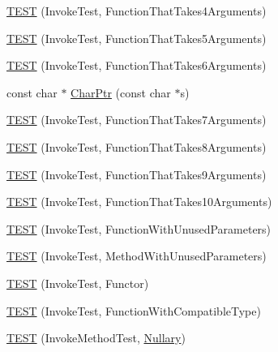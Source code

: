 \begin{DoxyCompactItemize}
\item 
\mbox{\hyperlink{namespacetesting_1_1gmock__more__actions__test_a17f41c1f7f180371d4d240089cdff0dd}{T\+E\+ST}} (Invoke\+Test, Function\+That\+Takes4\+Arguments)
\item 
\mbox{\hyperlink{namespacetesting_1_1gmock__more__actions__test_a3b6b1b682295a1d04d57374445359e94}{T\+E\+ST}} (Invoke\+Test, Function\+That\+Takes5\+Arguments)
\item 
\mbox{\hyperlink{namespacetesting_1_1gmock__more__actions__test_a9a6c89b83ba253838d05d7ee5da7d954}{T\+E\+ST}} (Invoke\+Test, Function\+That\+Takes6\+Arguments)
\item 
const char $\ast$ \mbox{\hyperlink{namespacetesting_1_1gmock__more__actions__test_a1dca0066cfa8595506df9bd0be2148db}{Char\+Ptr}} (const char $\ast$s)
\item 
\mbox{\hyperlink{namespacetesting_1_1gmock__more__actions__test_af4756ff87444dc6deb438a350ab5527f}{T\+E\+ST}} (Invoke\+Test, Function\+That\+Takes7\+Arguments)
\item 
\mbox{\hyperlink{namespacetesting_1_1gmock__more__actions__test_a48d99224a323afa3c9772a868dd60214}{T\+E\+ST}} (Invoke\+Test, Function\+That\+Takes8\+Arguments)
\item 
\mbox{\hyperlink{namespacetesting_1_1gmock__more__actions__test_a65d674aacb46d8bf79dbdfe0d49df442}{T\+E\+ST}} (Invoke\+Test, Function\+That\+Takes9\+Arguments)
\item 
\mbox{\hyperlink{namespacetesting_1_1gmock__more__actions__test_a8939ea1ccb0d8787c926c92441b27f6c}{T\+E\+ST}} (Invoke\+Test, Function\+That\+Takes10\+Arguments)
\item 
\mbox{\hyperlink{namespacetesting_1_1gmock__more__actions__test_a0dd6901e637db57c56f1cf8052b6e1bf}{T\+E\+ST}} (Invoke\+Test, Function\+With\+Unused\+Parameters)
\item 
\mbox{\hyperlink{namespacetesting_1_1gmock__more__actions__test_a4f48af38351403b569fc6dfae7787ed2}{T\+E\+ST}} (Invoke\+Test, Method\+With\+Unused\+Parameters)
\item 
\mbox{\hyperlink{namespacetesting_1_1gmock__more__actions__test_ac56a4cb164b338d3f388ed3f4306a5a5}{T\+E\+ST}} (Invoke\+Test, Functor)
\item 
\mbox{\hyperlink{namespacetesting_1_1gmock__more__actions__test_af9dfd7f1d4186ee4de2d9871a19dba5a}{T\+E\+ST}} (Invoke\+Test, Function\+With\+Compatible\+Type)
\item 
\mbox{\hyperlink{namespacetesting_1_1gmock__more__actions__test_abb046fd809977722720c9ce63afd7af5}{T\+E\+ST}} (Invoke\+Method\+Test, \mbox{\hyperlink{namespacetesting_1_1gmock__more__actions__test_acdd2dd80f777fdb770b513b63064ac19}{Nullary}})

\end{DoxyCompactItemize}
